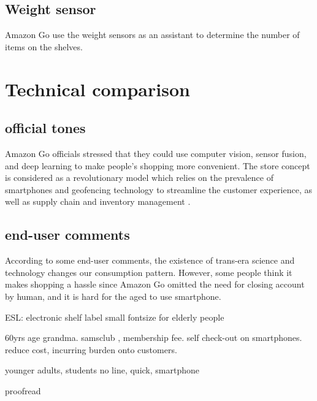 \subsection{Weight sensor}
Amazon Go use the weight sensors as an assistant to determine the number of items on the shelves.

\section{ Technical comparison }

\subsection{official tones}

Amazon Go officials stressed that they could use computer vision, sensor fusion, and deep learning to make people’s shopping more convenient.
The store concept is considered as a revolutionary model which relies on the prevalence of smartphones and geofencing technology to streamline the customer experience, as well as supply chain and inventory management\cite{GREWAL20171} .


\subsection{end-user comments}

According to some end-user comments, the existence of trans-era science and technology changes our consumption pattern. However, some people think it  makes shopping a hassle since Amazon Go omitted the need for closing account by human, and it is hard for the aged to use smartphone.

ESL: electronic shelf label
small fontsize for elderly people

60yrs age grandma.
samsclub , membership fee.  self check-out on smartphones.  reduce cost, incurring burden onto customers.

younger adults, students
no line, quick, smartphone 

proofread

